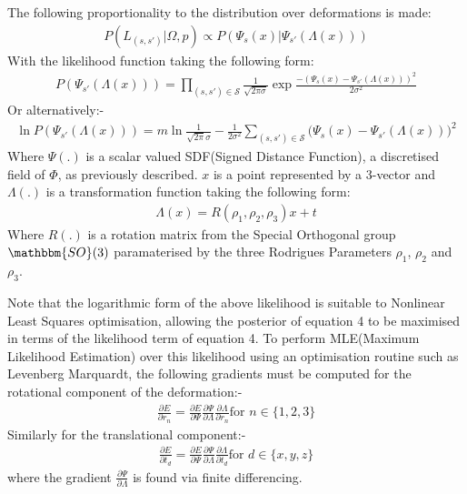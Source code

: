 The following proportionality to the distribution over deformations is made:
\begin{equation}
\begin{split}
P(L_{(s, s')} | \Omega, p) \propto P(\Psi_{s}(x) | \Psi_{s'}(\Lambda(x)))
\end{split}
\end{equation}
With the likelihood function taking the following form:
\begin{equation}
\begin{split}
P(\Psi_{s'}(\Lambda(x))) = \prod_{(s, s') \in \mathcal{S}} \frac{1}{\sqrt{2 \pi \sigma}} \exp{\frac{-(\Psi_{s}(x) - \Psi_{s'}(\Lambda(x)))^2}{2\sigma^2}}
\end{split}
\end{equation}
Or alternatively:-
\begin{equation}
\begin{split}
\ln P(\Psi_{s'}(\Lambda(x))) = m\ln\frac{1}{\sqrt{2\pi}\sigma}
-\frac{1}{2\sigma^2} \sum_{(s, s') \in \mathcal{S}} \bigg( \Psi_{s}(x) - \Psi_{s'}(\Lambda(x)) \bigg)^2
\end{split}
\end{equation}
Where $\Psi(.)$ is a scalar valued SDF(Signed Distance Function), a discretised field of $\Phi$, as previously described. $x$ is a point represented by a 3-vector and $\Lambda(.)$ is a transformation function taking the following form:
\begin{equation}
\begin{split}
\Lambda(x) = R(\rho_{1}, \rho_{2}, \rho_{3})x + t
\end{split}
\end{equation}
Where $R(.)$ is a rotation matrix from the Special Orthogonal group $\mathbbm{SO}(3)$ paramaterised by the three 
Rodrigues Parameters \cite{Shuster1993} $\rho_{1}$, $\rho_{2}$ and $\rho_{3}$.

Note that the logarithmic form of the above likelihood is suitable to Nonlinear Least Squares optimisation, allowing the posterior of equation 4 
to be maximised in terms of the likelihood term of equation 4. To perform MLE(Maximum Likelihood Estimation) over this likelihood using 
an optimisation routine such as Levenberg Marquardt, the following gradients must be computed for the rotational component of the 
deformation:-
\begin{equation}
\begin{split}
\frac{\partial E}{\partial r_{n}} = \frac{\partial E}{\partial \Psi} \frac{\partial \Psi}{\partial \Lambda} \frac{\partial \Lambda}{\partial r_{n}} \text{for } n \in \{1,2,3\}
\end{split}
\end{equation}
Similarly for the translational component:-
\begin{equation}
\begin{split}
\frac{\partial E}{\partial t_{d}} = \frac{\partial E}{\partial \Psi} \frac{\partial \Psi}{\partial \Lambda} \frac{\partial \Lambda}{\partial t_{d}} \text{for } d \in  \{x,y,z\}
\end{split}
\end{equation}
where the gradient $\frac{\partial \Psi}{\partial \Lambda}$ is found via finite differencing.

